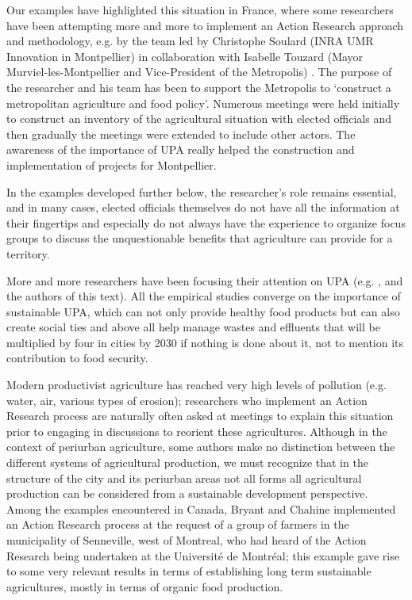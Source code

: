 \documentclass[10pt,a4paper]{article}
\begin{document}
\begin{multicols}{2}
Our examples have highlighted this situation in France, where some researchers have been attempting more and more to implement an Action Research approach and methodology, e.g. by the team led by Christophe Soulard (INRA UMR Innovation in Montpellier) in collaboration with Isabelle Touzard (Mayor Murviel-les-Montpellier and Vice-President of the Metropolis) \citep{r18}. The purpose of the researcher and his team has been to support the Metropolis to `construct a metropolitan agriculture and food policy'. Numerous meetings were held initially to construct an inventory of the agricultural situation with elected officials and then gradually the meetings were extended to include other actors. The awareness of the importance of UPA really helped the construction and implementation of projects for Montpellier.

In the examples developed further below, the researcher's role remains essential, and in many cases, elected officials themselves do not have all the information at their fingertips and especially do not always have the experience to organize focus groups to discuss the unquestionable benefits that agriculture can provide for a territory.

More and more researchers have been focusing their attention on UPA (e.g. \citep{r02, r21, r22, r14, r23}, and the authors of this text). All the empirical studies converge on the importance of sustainable UPA, which can not only provide healthy food products but can also create social ties and above all help manage wastes and effluents that will be multiplied by four in cities by 2030 \citep{r24} if nothing is done about it, not to mention its contribution to food security.

Modern productivist agriculture has reached very high levels of pollution (e.g. water, air, various types of erosion); researchers who implement an Action Research process are naturally often asked at meetings to explain this situation prior to engaging in discussions to reorient these agricultures. Although in the context of periurban agriculture, some authors make no distinction between the different systems of agricultural production, we must recognize that in the structure of the city and its periurban areas not all forms all agricultural production can be considered from a sustainable development perspective. Among the examples encountered in Canada, Bryant and Chahine \citep{r06} implemented an Action Research process at the request of a group of farmers in the municipality of Senneville, west of Montreal, who had heard of the Action Research being undertaken at the Université de Montréal; this example gave rise to some very relevant results in terms of establishing long term sustainable agricultures, mostly in terms of organic food production.


\end{multicols}
\end{document}
